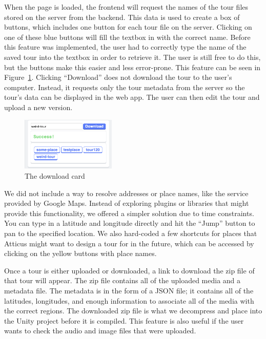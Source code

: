 \documentclass[a4paper, 10pt, american, titlepage]{article}
\begin{document}
When the page is loaded, the frontend will request the names of the tour files
stored on the server from the backend. This data is used to create a box of
buttons, which includes one button for each tour file on the server. Clicking
on one of these blue buttons will fill the textbox in with the correct name.
Before this feature was implemented, the user had to correctly type the name of
the saved tour into the textbox in order to retrieve it. The user is still free
to do this, but the buttons make this easier and less error-prone. This feature
can be seen in Figure~\ref{fig:downloadCard}. Clicking ``Download'' does
not download the tour to the user's computer. Instead, it requests only the
tour metadata from the server so the tour's data can be displayed in the web
app. The user can then edit the tour and upload a new version.

\begin{figure}[h]
	\centering
    \includegraphics[width=0.4\textwidth]{download-card-editour.png}
    \caption{The download card}
	\label{fig:downloadCard}
\end{figure}

We did not include a way to resolve addresses or place names, like the service
provided by Google Maps. Instead of exploring plugins or libraries that might
provide this functionality, we offered a simpler solution due to time
constraints.  You can type in a latitude and longitude directly and hit the
``Jump'' button to pan to the specified location. We also hard-coded a few
shortcuts for places that Atticus might want to design a tour for in the future,
which can be accessed by clicking on the yellow buttons with place names.

Once a tour is either uploaded or downloaded, a link to download the zip file of
that tour will appear. The zip file contains all of the uploaded media and a
metadata file. The metadata is in the form of a JSON file; it contains all of
the latitudes, longitudes, and enough information to associate all of the media
with the correct regions. The downloaded zip file is what we decompress and
place into the Unity project before it is compiled. This feature is also useful
if the user wants to check the audio and image files that were uploaded.
\end{document}
